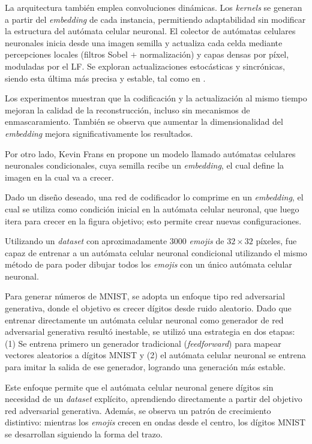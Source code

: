 La arquitectura también emplea convoluciones dinámicas. Los \textit{kernels} se generan a partir del \textit{embedding} de cada instancia, permitiendo adaptabilidad sin modificar la estructura del autómata celular neuronal. El colector de autómatas celulares neuronales inicia desde una imagen semilla y actualiza cada celda mediante percepciones locales (filtros Sobel $+$ normalización) y capas densas por píxel, moduladas por el LF. Se exploran actualizaciones estocásticas y sincrónicas, siendo esta última más precisa y estable, tal como en \cite{NiklassonNCA}.

Los experimentos muestran que la codificación y la actualización al mismo tiempo mejoran la calidad de la reconstrucción, incluso sin mecanismos de enmascaramiento. También se observa que aumentar la dimensionalidad del \textit{embedding} mejora significativamente los resultados.

Por otro lado, Kevin Frans en \cite{StampCA} propone un modelo llamado autómatas celulares neuronales condicionales, cuya semilla recibe un \textit{embedding}, el cual define la imagen en la cual va a crecer. 

Dado un diseño deseado, una red de codificador lo comprime en un \textit{embedding}, el cual se utiliza como condición inicial en la autómata celular neuronal, que luego itera para crecer en la figura objetivo; esto permite crear nuevas configuraciones.

Utilizando un \textit{dataset} con aproximadamente 3000 \textit{emojis} de $32 \times 32$ píxeles, fue capaz de entrenar a un autómata celular neuronal condicional utilizando el mismo método de \cite{mordvintsevNCA} para poder dibujar todos los \textit{emojis} con un único autómata celular neuronal.

Para generar números de MNIST, se adopta un enfoque tipo red adversarial generativa, donde el objetivo es crecer dígitos desde ruido aleatorio. Dado que entrenar directamente un autómata celular neuronal como generador de red adversarial generativa resultó inestable, se utilizó una estrategia en dos etapas: (1) Se entrena primero un generador tradicional (\textit{feedforward}) para mapear vectores aleatorios a dígitos MNIST y (2) el autómata celular neuronal se entrena para imitar la salida de ese generador, logrando una generación más estable.

Este enfoque permite que el autómata celular neuronal genere dígitos sin necesidad de un \textit{dataset} explícito, aprendiendo directamente a partir del objetivo red adversarial generativa. Además, se observa un patrón de crecimiento distintivo: mientras los \textit{emojis} crecen en ondas desde el centro, los dígitos MNIST se desarrollan siguiendo la forma del trazo.

